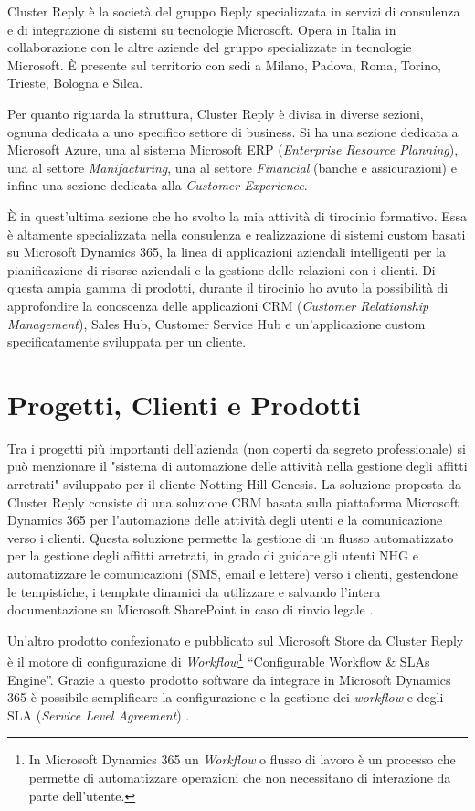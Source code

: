 Cluster Reply è la società del gruppo Reply specializzata in servizi di consulenza e di integrazione di sistemi su tecnologie Microsoft. Opera in Italia in collaborazione con le altre aziende del gruppo specializzate in tecnologie Microsoft. È presente sul territorio con sedi a Milano, Padova, Roma, Torino, Trieste, Bologna e Silea. 

Per quanto riguarda la struttura, Cluster Reply è divisa in diverse sezioni, ognuna dedicata a uno specifico settore di business. Si ha una sezione dedicata a Microsoft Azure, una al sistema Microsoft ERP (\textit{Enterprise Resource Planning}), una al settore \textit{Manifacturing}, una al settore \textit{Financial} (banche e assicurazioni) e infine una sezione dedicata alla \textit{Customer Experience}.

È in quest'ultima sezione che ho svolto la mia attività di tirocinio formativo. Essa è altamente specializzata nella consulenza e realizzazione di sistemi custom basati su Microsoft Dynamics 365, la linea di applicazioni aziendali intelligenti per la pianificazione di risorse aziendali e la gestione delle relazioni con i clienti. Di questa ampia gamma di prodotti, durante il tirocinio ho avuto la possibilità di approfondire la conoscenza delle applicazioni CRM (\textit{Customer Relationship Management}), Sales Hub, Customer Service Hub e un'applicazione custom specificatamente sviluppata per un cliente.

\section{Progetti, Clienti e Prodotti}
Tra i progetti più importanti dell'azienda (non coperti da segreto professionale) si può menzionare il "sistema di automazione delle attività nella gestione degli affitti arretrati" sviluppato per il cliente Notting Hill Genesis. La soluzione proposta da Cluster Reply consiste di una soluzione CRM basata sulla piattaforma Microsoft Dynamics 365 per l'automazione  delle attività degli utenti e la comunicazione verso i clienti. Questa soluzione permette la gestione di un flusso automatizzato per la gestione degli affitti arretrati, in grado di guidare gli utenti NHG e automatizzare le comunicazioni (SMS, email e lettere) verso i clienti, gestendone le tempistiche, i template dinamici da utilizzare e salvando l'intera documentazione su Microsoft SharePoint in caso di rinvio legale \cite{NHG}.

Un'altro prodotto confezionato e pubblicato sul Microsoft Store da Cluster Reply è il motore di configurazione di \textit{Workflow}\footnote{In Microsoft Dynamics 365 un \textit{Workflow} o flusso di lavoro è un processo che permette di automatizzare operazioni che non necessitano di interazione da parte dell'utente.} “Configurable Workflow \& SLAs Engine”. Grazie a questo prodotto software da integrare in Microsoft Dynamics 365 è possibile semplificare la configurazione e la gestione dei \textit{workflow} e degli SLA (\textit{Service Level Agreement}) \cite{configurableWorkflow}.

